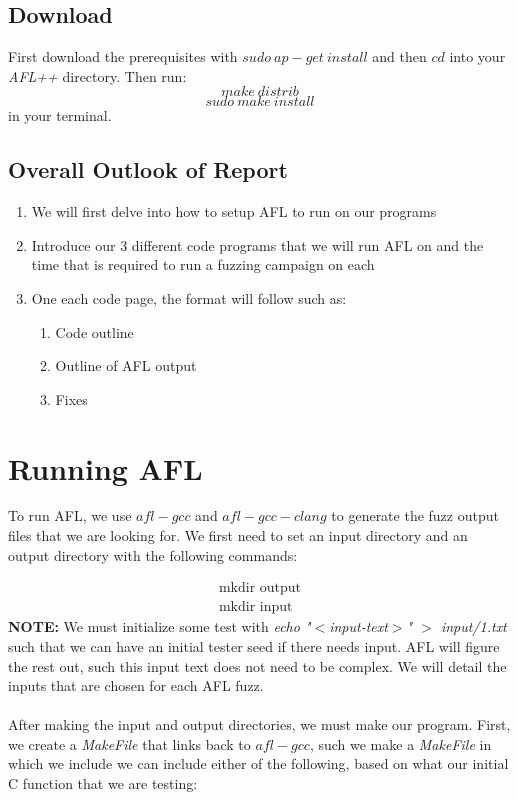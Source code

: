 \documentclass[11pt]{article}
\begin{document}
\subsection{Download}
First download the prerequisites with $sudo \: ap-get \: install$ and then $cd$ into your \textit{AFL++} directory. Then run:
\begin{equation}
    make \: distrib 
\end{equation}
\begin{equation}
    sudo \: make \: install
\end{equation}
in your terminal.
\subsection{Overall Outlook of Report}
\begin{enumerate}
    \item We will first delve into how to setup AFL to run on our programs
    \item Introduce our 3 different code programs that we will run AFL on and the time that is required to run a fuzzing campaign on each
    \item One each code page, the format will follow such as:
    \begin{enumerate}
        \item Code outline
        \item Outline of AFL output
        \item Fixes
    \end{enumerate}
\end{enumerate}

\newpage

\section{Running AFL}
To run AFL, we use $afl-gcc$ and $afl-gcc-clang$ to generate the fuzz output files that we are looking for. We first need to set an input directory and an output directory with the following commands:

\begin{eqnarray}
    \text{mkdir output} \\
    \text{mkdir input}
\end{eqnarray}
\textbf{NOTE:} We must initialize some test with \textit{echo "$<$input-text$>$" $>$ input/1.txt} such that we can have an initial tester seed if there needs input. AFL will figure the rest out, such this input text does not need to be complex. We will detail the inputs that are chosen for each AFL fuzz. 
\\
\\
After making the input and output directories, we must make our program. First, we create a \textit{MakeFile} that links back to $afl-gcc$, such we make a \textit{MakeFile} in which we include we can include either of the following, based on what our initial C function that we are testing:
\end{document}

